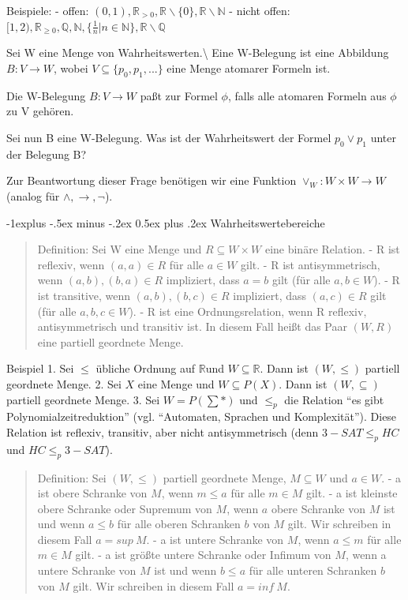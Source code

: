 \documentclass[a4paper]{article}
\makeatletter
\renewcommand{\subsection}{\@startsection{subsection}{2}{0mm}%
                {-1explus -.5ex minus -.2ex}%
                {0.5ex plus .2ex}%
                {\normalfont\normalsize\bfseries}}
\makeatother
\begin{document}
\begin{multicols}{3}
  Beispiele: - offen:
  $(0,1), \mathbb{R}_{>0}, \mathbb{R}\backslash\{0\}, \mathbb{R}\backslash\mathbb{N}$
  - nicht offen:
  $[1,2), \mathbb{R}_{\geq 0}, \mathbb{Q}, \mathbb{N}, \{\frac{1}{n} | n\in\mathbb{N}\}, \mathbb{R}\backslash\mathbb{Q}$

  Sei W eine Menge von Wahrheitswerten.\textbackslash{} Eine W-Belegung
  ist eine Abbildung $B:V\rightarrow W$, wobei
  $V\subseteq\{p_0 ,p_1 ,...\}$ eine Menge atomarer Formeln ist.

  Die W-Belegung $B:V\rightarrow W$ paßt zur Formel $\phi$, falls alle
  atomaren Formeln aus $\phi$ zu V gehören.

  Sei nun B eine W-Belegung. Was ist der Wahrheitswert der Formel
  $p_0\vee p_1$ unter der Belegung B?

  Zur Beantwortung dieser Frage benötigen wir eine Funktion
  $\vee_W :W\times W\rightarrow W$ (analog für
  $\wedge,\rightarrow,\lnot$).

  \subsection{Wahrheitswertebereiche}\label{wahrheitswertebereiche}

  \begin{quote}
    Definition: Sei W eine Menge und $R\subseteq W\times W$ eine binäre
    Relation. - R ist reflexiv, wenn $(a,a)\in R$ für alle $a\in W$ gilt. -
    R ist antisymmetrisch, wenn $(a,b),(b,a)\in R$ impliziert, dass $a=b$
    gilt (für alle $a,b\in W$). - R ist transitive, wenn $(a,b),(b,c)\in R$
    impliziert, dass $(a,c)\in R$ gilt (für alle $a,b,c\in W$). - R ist eine
    Ordnungsrelation, wenn R reflexiv, antisymmetrisch und transitiv ist. In
    diesem Fall heißt das Paar $(W,R)$ eine partiell geordnete Menge.
  \end{quote}

  Beispiel 1. Sei $\leq$ übliche Ordnung auf $\mathbb{R}$und
  $W\subseteq\mathbb{R}$. Dann ist $(W,\leq)$ partiell geordnete Menge. 2.
  Sei $X$ eine Menge und $W\subseteq P(X)$. Dann ist $(W,\subseteq)$
  partiell geordnete Menge. 3. Sei $W=P(\sum *)$ und $\leq_p$ die Relation
  ``es gibt Polynomialzeitreduktion'' (vgl. ``Automaten, Sprachen und
  Komplexität''). Diese Relation ist reflexiv, transitiv, aber nicht
  antisymmetrisch (denn $3-SAT\leq_{p} HC$ und $HC\leq_{p} 3-SAT$).

  \begin{quote}
    Definition: Sei $(W,\leq)$ partiell geordnete Menge, $M\subseteq W$ und
    $a\in W$. - a ist obere Schranke von $M$, wenn $m\leq a$ für alle
    $m\in M$ gilt. - a ist kleinste obere Schranke oder Supremum von $M$,
    wenn $a$ obere Schranke von $M$ ist und wenn $a\leq b$ für alle oberen
    Schranken $b$ von $M$ gilt. Wir schreiben in diesem Fall $a=sup \ M$. -
    a ist untere Schranke von $M$, wenn $a\leq m$ für alle $m\in M$ gilt. -
    a ist größte untere Schranke oder Infimum von $M$, wenn a untere
    Schranke von $M$ ist und wenn $b\leq a$ für alle unteren Schranken $b$
    von $M$ gilt. Wir schreiben in diesem Fall $a=inf\ M$.
  \end{quote}


\end{multicols}
\end{document}
